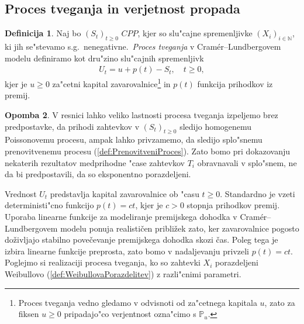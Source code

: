 \documentclass[12pt, a4paper, reqno]{amsart}
\theoremstyle{definition}
\newtheorem{definicija}{Definicija}[section]
\newtheorem{opomba}[definicija]{Opomba}
\theoremstyle{plain}
\newcommand{\N}{\mathbb{N}}
\newcommand{\Prob}{\mathbb{P}}
\newcommand{\1}{\mathds{1}}
\begin{document}
    \subsection{Proces tveganja in verjetnost propada}

        \begin{definicija}
            Naj bo $(S_t)_{t\geq0 }$ $CPP$, kjer so slu"cajne spremenljivke $(X_i)_{i\in\N}$, 
            ki jih se"stevamo s.g.\ nenegativne.\ \textit{Proces tveganja} v Cramér--Lundbergovem 
            modelu definiramo kot dru"zino slu"cajnih spremenljivk 
            \begin{align*}
                U_t = u + p(t) - S_t, \quad t\geq0,
            \end{align*}
            kjer je $u \geq 0$ za"cetni kapital zavarovalnice\footnote{Proces tveganja vedno gledamo 
            v odvisnoti od  za"cetnega kapitala $u$, zato za fiksen $u\geq0$ pripadajo"co verjentnost
            ozna"cimo s $\Prob_u$.} in $p(t)$ funkcija prihodkov iz premij. 
            \label{def:procesTveganja}
        \end{definicija}

        \begin{opomba}
            V resnici lahko veliko lastnosti procesa tveganja izpeljemo brez predpostavke, da prihodi 
            zahtevkov v $(S_t)_{t\geq0}$ sledijo homogenemu Poissonovemu procesu,
            ampak lahko privzamemo, da sledijo splo"snemu prenovitvenemu procesu (\ref{def:PrenovitveniProces}). 
            Zato bomo pri dokazovanju nekaterih rezultatov medprihodne "case zahtevkov $T_i$ obravnavali v 
            splo"snem, ne da bi predpostavili, da so eksponentno porazdeljeni.
            \label{op:procesTveganja}
        \end{opomba}

        Vrednost $U_t$ predstavlja kapital zavarovalnice ob "casu $t\geq0$. Standardno je  
        vzeti deterministi"cno funkcijo $p(t) = ct$, kjer je $c>0$ stopnja prihodkov premij.
        Uporaba linearne funkcije za modeliranje premijskega dohodka v Cramér--Lundbergovem 
        modelu ponuja realističen približek zato, ker zavarovalnice pogosto doživljajo 
        stabilno povečevanje premijskega dohodka skozi čas. Poleg tega je izbira linearne 
        funkcije preprosta, zato bomo v nadaljevanju privzeli $p(t) = ct$. Poglejmo si 
        realizaciji procesa tveganja, ko so zahtevki $X_i$ porazdeljeni Weibullovo 
        (\ref{def:WeibullovaPorazdelitev}) z razli"cnimi parametri. 
\end{document}

